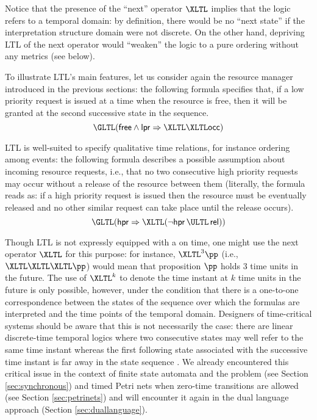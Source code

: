 Notice that the presence of the ``next'' operator $\XLTL$ implies 
that the logic refers to a  temporal domain: by definition, 
there would be no ``next state'' if the interpretation structure 
domain were not discrete. On the other hand, depriving LTL of 
the next operator would ``weaken'' the logic to a pure ordering 
without any metrics (see below).

To illustrate LTL's main features, let us consider again the 
resource manager introduced in the previous sections: the following 
formula specifies that, if a low priority request is issued at 
a time when the resource is free, then it will be granted at 
the second successive state in the sequence. 
\begin{equation*}
  \GLTL ( \mathsf{free} \wedge \mathsf{lpr}  \Rightarrow \XLTL \XLTL \mathsf{occ} )
\end{equation*}

LTL is well-suited to specify qualitative time relations, for 
instance ordering among events: the following formula describes 
a possible assumption about incoming resource requests, i.e., 
that no two consecutive high priority requests may occur without 
a release of the resource between them (literally, the formula 
reads as: if a high priority request is issued then the resource must be eventually released and no other 
similar request can take place until the release occurs). 
\begin{equation*}
  \GLTL ( \mathsf{hpr} \Rightarrow \XLTL ( \neg \mathsf{hpr} \, \ULTL \,\mathsf{rel} ))
\end{equation*}

Though LTL is not expressly equipped with a  on time, one might
use the next operator $\XLTL$ for this purpose: for instance, $\XLTL^3
\pp$ (i.e., $\XLTL \XLTL \XLTL \pp$) would mean that proposition $\pp$
holds 3 time units in the future. The use of $\XLTL^k$ to denote the
time instant at $k$ time units in the future is only possible,
however, under the condition that there is a one-to-one correspondence
between the states of the sequence over which the formulas are
interpreted and the time points of the temporal domain. Designers of
time-critical systems should be aware that this is not necessarily the
case: there are linear discrete-time temporal logics where two
consecutive states may well refer to the same time instant whereas the
first following state associated with the successive time instant is
far away in the state sequence \cite{Lam94,MP92,Ost89}. We already
encountered this critical issue in the context of finite state
automata and the  problem (see Section \ref{sec:synchronous})
and timed Petri nets when zero-time transitions are allowed (see
Section \ref{sec:petrinets}) and will encounter it again in the dual
language approach (Section \ref{sec:duallanguage}).


